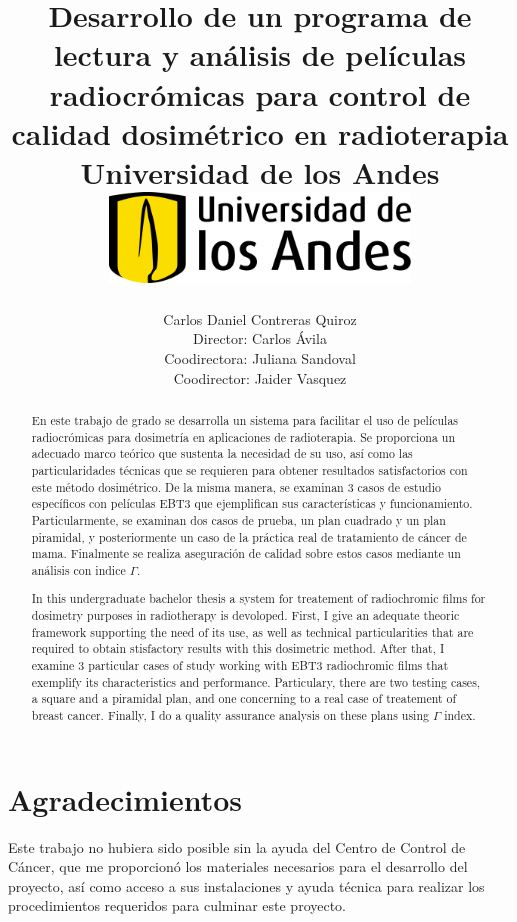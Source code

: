\documentclass[12pt]{report}
\title 
{
	{Desarrollo de un programa de lectura y análisis de películas radiocrómicas para control de calidad dosimétrico en radioterapia}\\
	{\large Universidad de los Andes}\\
	\vspace{1.5cm}
	{\includegraphics[width = 0.6\textwidth]{logo.png}}	
}
\author{Carlos Daniel Contreras Quiroz\\[1cm]{\small Director: Carlos \'Avila}\\[1cm]{\small Coodirectora: Juliana Sandoval}\\[1cm]{\small Coodirector: Jaider Vasquez}}
\newenvironment{dedication}
  {\clearpage           %
   \thispagestyle{empty}%
   \vspace*{\stretch{1}}%
   \raggedleft          %
  }
  {\par %
   \vspace{\stretch{3}} %
   \clearpage           %
  }
\theoremstyle{definition}
\begin{document}

\maketitle


\begin{abstract}

En este trabajo de grado se desarrolla un sistema para facilitar el uso de películas radiocrómicas para dosimetría en aplicaciones de radioterapia. Se proporciona un adecuado marco teórico que sustenta la necesidad de su uso, así como las particularidades técnicas que se requieren para obtener resultados satisfactorios con este método dosimétrico. De la misma manera, se examinan 3 casos de estudio específicos con películas EBT3 que ejemplifican sus características y funcionamiento. Particularmente, se examinan dos casos de prueba, un plan cuadrado y un plan piramidal, y posteriormente un caso de la práctica real de tratamiento de cáncer de mama. Finalmente se realiza aseguración de calidad sobre estos casos mediante un análisis con indice $\Gamma$.   

\end{abstract}

\begin{otherlanguage}{english}
	
\begin{abstract}
In this undergraduate bachelor thesis a system for treatement of radiochromic films for dosimetry purposes in radiotherapy is devoloped. First, I give an adequate theoric framework supporting the need of its use, as well as technical particularities that are required to obtain stisfactory results with this dosimetric method. After that, I examine 3 particular cases of study working with EBT3 radiochromic films that exemplify its characteristics and performance. Particulary, there are two testing cases, a square and a piramidal plan, and one concerning to a real case of treatement of breast cancer. Finally, I do a quality assurance analysis on these plans using $\Gamma$ index. 

\end{abstract}
\end{otherlanguage}

\newpage

\chapter*{Agradecimientos}
Este trabajo no hubiera sido posible sin la ayuda del Centro de Control de Cáncer, que me proporcionó los materiales necesarios para el desarrollo del proyecto, así como acceso a sus instalaciones y ayuda técnica para realizar los procedimientos requeridos para culminar este proyecto.\\
\end{document}
